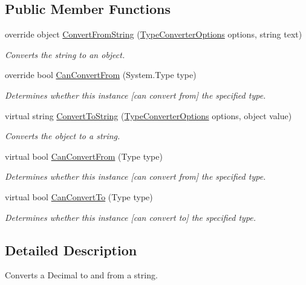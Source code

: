 \subsection*{Public Member Functions}
\begin{DoxyCompactItemize}
\item 
override object \hyperlink{a00084_a07444e6f2bb1e49288f9de3b2407dc4f}{Convert\-From\-String} (\hyperlink{a00158}{Type\-Converter\-Options} options, string text)
\begin{DoxyCompactList}\small\item\em Converts the string to an object. \end{DoxyCompactList}\item 
override bool \hyperlink{a00084_aba0f1c085a1c33779ea791bb814b6aa5}{Can\-Convert\-From} (System.\-Type type)
\begin{DoxyCompactList}\small\item\em Determines whether this instance \mbox{[}can convert from\mbox{]} the specified type. \end{DoxyCompactList}\item 
virtual string \hyperlink{a00086_a36cb2f9b24f15a671293f3a722324c27}{Convert\-To\-String} (\hyperlink{a00158}{Type\-Converter\-Options} options, object value)
\begin{DoxyCompactList}\small\item\em Converts the object to a string. \end{DoxyCompactList}\item 
virtual bool \hyperlink{a00086_a470d21adaa704eb281250dbd112ff91a}{Can\-Convert\-From} (Type type)
\begin{DoxyCompactList}\small\item\em Determines whether this instance \mbox{[}can convert from\mbox{]} the specified type. \end{DoxyCompactList}\item 
virtual bool \hyperlink{a00086_acb65bd8c8199d88d5b1629ae35d18514}{Can\-Convert\-To} (Type type)
\begin{DoxyCompactList}\small\item\em Determines whether this instance \mbox{[}can convert to\mbox{]} the specified type. \end{DoxyCompactList}\end{DoxyCompactItemize}


\subsection{Detailed Description}
Converts a Decimal to and from a string. 



